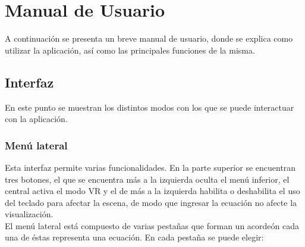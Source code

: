\documentclass[12pt]{article}
\begin{document}
\section{Manual de Usuario}
A continuación se presenta un breve manual de usuario, donde se explica como utilizar la aplicación, así como las principales funciones de la misma.
\subsection{Interfaz}
En este punto se muestran los distintos modos con los que se puede interactuar con la aplicación.
\subsubsection{Menú lateral}
Esta interfaz permite varias funcionalidades. En la parte superior se encuentran tres botones, el que se encuentra más a la izquierda oculta el menú inferior, el central activa el modo VR y el de más a la izquierda habilita o deshabilita el uso del teclado para afectar la escena, de modo que ingresar la ecuación no afecte la visualización.
\\El menú lateral está compuesto de varias pestañas que forman un acordeón cada una de éstas representa una ecuación. En cada pestaña se puede elegir:
\end{document}
